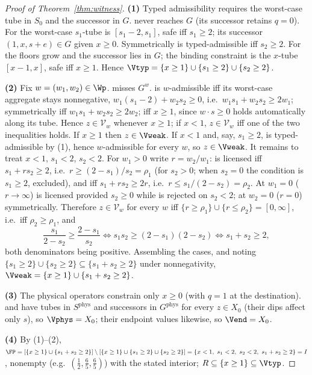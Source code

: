 \begin{proof}[Proof of Theorem~\ref{thm:witness}]
\textbf{(1)} Typed admissibility requires the worst-case tube in $S_0$ and the successor in $G$.  never reaches $G$ (its successor retains $q=0$). For  the worst-case $s_1$-tube is $[s_1-2,s_1]$, safe iff $s_1\ge2$; its successor $(1,x,s+e)\in G$ given $x\ge0$. Symmetrically  is typed-admissible iff $s_2\ge2$. For  the floors grow and the successor lies in $G$; the binding constraint is the $x$-tube $[x-1,x]$, safe iff $x\ge1$. Hence $\Vtyp=\{x\ge1\}\cup\{s_1\ge2\}\cup\{s_2\ge2\}$.

\textbf{(2)} Fix $w=(w_1,w_2)\in\Wp$.  misses $G^w$.  is $w$-admissible iff its worst-case aggregate stays nonnegative, $w_1(s_1-2)+w_2s_2\ge0$, i.e.\ $w_1s_1+w_2s_2\ge2w_1$; symmetrically  iff $w_1s_1+w_2s_2\ge2w_2$;  iff $x\ge1$, since $w\cdot s\ge0$ holds automatically along its tube. Hence $z\in\mathcal V_w$ whenever $x\ge1$; if $x<1$, $z\in\mathcal V_w$ iff one of the two inequalities holds. If $x\ge1$ then $z\in\Vweak$. If $x<1$ and, say, $s_1\ge2$,  is typed-admissible by (1), hence $w$-admissible for every $w$, so $z\in\Vweak$. It remains to treat $x<1$, $s_1<2$, $s_2<2$. For $w_1>0$ write $r=w_2/w_1$:  is licensed iff $s_1+rs_2\ge2$, i.e.\ $r\ge(2-s_1)/s_2=\rho_1$ (for $s_2>0$; when $s_2=0$ the condition is $s_1\ge2$, excluded), and  iff $s_1+rs_2\ge2r$, i.e.\ $r\le s_1/(2-s_2)=\rho_2$. At $w_1=0$ ($r\to\infty$)  is licensed provided $s_2\ge0$ while  is rejected on $s_2<2$; at $w_2=0$ ($r=0$) symmetrically. Therefore $z\in\mathcal V_w$ for every $w$ iff $\{r\ge\rho_1\}\cup\{r\le\rho_2\}=[0,\infty]$, i.e.\ iff $\rho_2\ge\rho_1$, and
\[
\frac{s_1}{2-s_2}\ge\frac{2-s_1}{s_2}\iff s_1s_2\ge(2-s_1)(2-s_2)\iff s_1+s_2\ge2,
\]
both denominators being positive. Assembling the cases, and noting $\{s_1\ge2\}\cup\{s_2\ge2\}\subseteq\{s_1+s_2\ge2\}$ under nonnegativity, $\Vweak=\{x\ge1\}\cup\{s_1+s_2\ge2\}$.

\textbf{(3)} The physical operators constrain only $x\ge0$ (with $q=1$ at the destination).  and  have tubes in $S^{\mathrm{phys}}$ and successors in $G^{\mathrm{phys}}$ for every $z\in X_0$ (their dips affect only $s$), so $\Vphys=X_0$; their endpoint values likewise, so $\Vend=X_0$.

\textbf{(4)} By (1)--(2), $\FP=[\{x\ge1\}\cup\{s_1+s_2\ge2\}]\setminus[\{x\ge1\}\cup\{s_1\ge2\}\cup\{s_2\ge2\}]=\{x<1,\ s_1<2,\ s_2<2,\ s_1+s_2\ge2\}=I$, nonempty (e.g.\ $(\tfrac12,\tfrac65,\tfrac65)$) with the stated interior; $R\subseteq\{x\ge1\}\subseteq\Vtyp$.


\end{proof}
